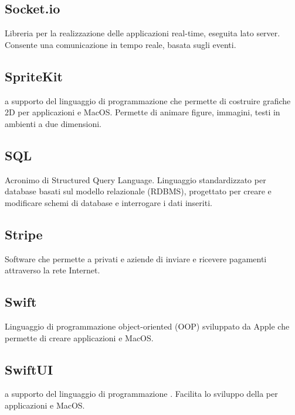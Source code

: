 \subsection*{Socket.io}
Libreria  per la realizzazione delle applicazioni real-time, eseguita lato server. Consente una comunicazione in tempo reale, basata sugli eventi.

\subsection*{SpriteKit}
 a supporto del linguaggio di programmazione  che permette di costruire grafiche 2D per applicazioni  e MacOS. Permette di animare figure, immagini, testi in ambienti a due dimensioni.

\subsection*{SQL}
Acronimo di Structured Query Language. Linguaggio standardizzato per database basati sul modello relazionale (RDBMS), progettato per creare e modificare schemi di database e interrogare i dati inseriti.

\subsection*{Stripe}
Software che permette a privati e aziende di inviare e ricevere pagamenti attraverso la rete Internet.

\subsection*{Swift}
Linguaggio di programmazione object-oriented (OOP) sviluppato da Apple che permette di creare applicazioni  e MacOS.  

\subsection*{SwiftUI}
 a supporto del linguaggio di programmazione . Facilita lo sviluppo della  per applicazioni  e MacOS.